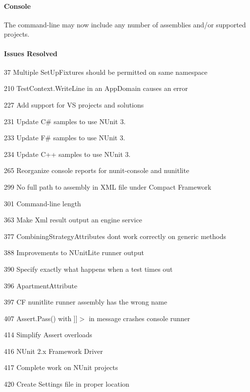 \paragraph*{Console}


\begin{DoxyItemize}
\item The command-\/line may now include any number of assemblies and/or supported projects.
\end{DoxyItemize}

\paragraph*{Issues Resolved}


\begin{DoxyItemize}
\item 37 Multiple Set\+Up\+Fixtures should be permitted on same namespace
\item 210 Test\+Context.\+Write\+Line in an App\+Domain causes an error
\item 227 Add support for VS projects and solutions
\item 231 Update C\# samples to use N\+Unit 3.
\item 233 Update F\# samples to use N\+Unit 3.
\item 234 Update C++ samples to use N\+Unit 3.
\item 265 Reorganize console reports for nunit-\/console and nunitlite
\item 299 No full path to assembly in X\+ML file under Compact Framework
\item 301 Command-\/line length
\item 363 Make Xml result output an engine service
\item 377 Combining\+Strategy\+Attributes don\textquotesingle{}t work correctly on generic methods
\item 388 Improvements to N\+Unit\+Lite runner output
\item 390 Specify exactly what happens when a test times out
\item 396 Apartment\+Attribute
\item 397 CF nunitlite runner assembly has the wrong name
\item 407 Assert.\+Pass() with \mbox{]}\mbox{]}$>$ in message crashes console runner
\item 414 Simplify Assert overloads
\item 416 N\+Unit 2.\+x Framework Driver
\item 417 Complete work on N\+Unit projects
\item 420 Create Settings file in proper location
\end{DoxyItemize}

